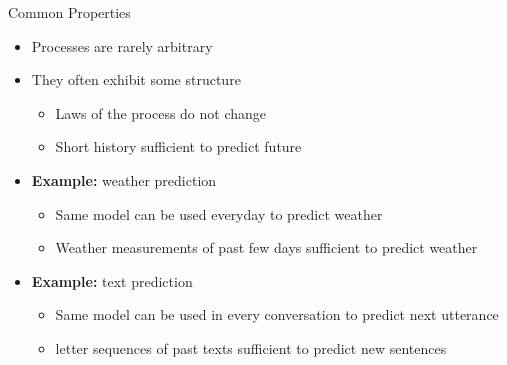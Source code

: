 \documentclass[11pt,table]{beamer}
\begin{document}
\begin{frame}{Common Properties}


\begin{itemize}
    \item  Processes are rarely arbitrary
\item They often exhibit some structure
\begin{itemize}
    \item  Laws of the process do not change
\item Short history sufficient to predict future
 

\end{itemize}
\pause
\item  \textbf{Example:} weather prediction

\begin{itemize}
    \item  Same model can be used everyday to predict  weather
\item Weather measurements of past few days sufficient  to predict weather
 
\end{itemize}
\pause

\item  \textbf{Example:} text prediction

\begin{itemize}
    \item  Same model can be used in every conversation to predict next utterance
\item letter sequences of past texts sufficient to predict new sentences
 
\end{itemize}

\end{itemize}
    
\end{frame}
\end{document}
